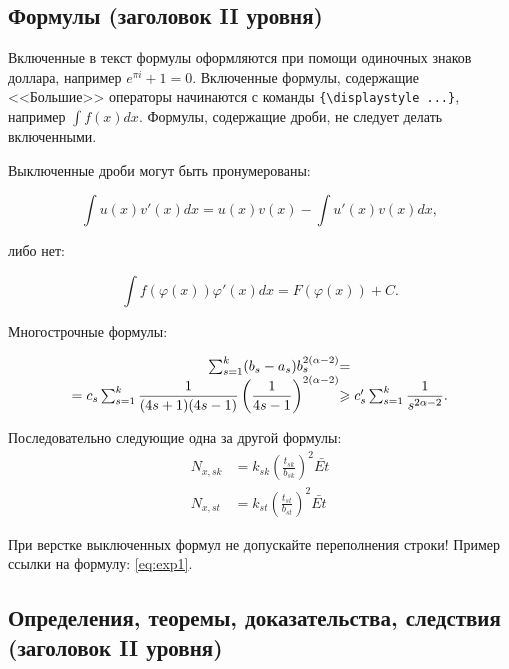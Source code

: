 \documentclass{math-mech-sci}
\begin{document}
\subsection*{Формулы (заголовок II уровня)}

Включенные в текст формулы оформляются при помощи одиночных знаков доллара, например $e^{\pi i} + 1 = 0$.
Включенные формулы, содержащие <<Большие>> операторы начинаются с команды \verb"{\displaystyle ...}", например ${\displaystyle\int f(x)dx}$. Формулы, содержащие дроби, не следует делать включенными.

Выключенные дроби могут быть пронумерованы:

\begin{equation}
	\label{eq:exp1}
	\int u(x)v'(x)dx=u(x)v(x)-\int u'(x)v(x)dx,
\end{equation}

либо нет:

\begin{equation*}
	\int f(\varphi(x))\varphi'(x)dx=F(\varphi(x))+C.
\end{equation*}

Многострочные формулы:

\begin{equation}\label{eq:exp2}
\begin{array}{r@{}l}
	\sum^{k}_{s=1}(b_s-a_s)b^{2(\alpha-2)}_s  &= \\
	=c_s\sum^{k}_{s=1}\displaystyle\frac{1}{(4s+1)(4s-1)}\left(\displaystyle\frac{1}{4s-1}\right)^{2(\alpha-2)}
	&\geqslant c'_s\sum^{k}_{s=1}\displaystyle\frac{1}{s^{2\alpha-2}}.
\end{array}
\end{equation}

Последовательно следующие одна за другой формулы:
\begin{align}
	N_{x,sk} &= k_{sk}\left(\frac{t_{sk}}{b_{sk}}\right)^{2}\bar{Et}\\
	N_{x,st} &= k_{st}\left(\frac{t_{st}}{b_{st}}\right)^{2}\bar{Et}
\end{align}

При верстке выключенных формул не допускайте переполнения строки! Пример ссылки на формулу: \eqref{eq:exp1}.

\subsection*{Определения, теоремы, доказательства, следствия (заголовок II уровня)}
\end{document}
